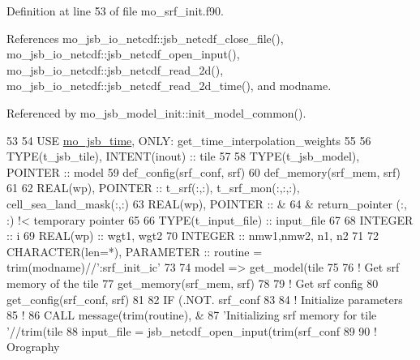 Definition at line 53 of file mo\+\_\+srf\+\_\+init.\+f90.



References mo\+\_\+jsb\+\_\+io\+\_\+netcdf\+::jsb\+\_\+netcdf\+\_\+close\+\_\+file(), mo\+\_\+jsb\+\_\+io\+\_\+netcdf\+::jsb\+\_\+netcdf\+\_\+open\+\_\+input(), mo\+\_\+jsb\+\_\+io\+\_\+netcdf\+::jsb\+\_\+netcdf\+\_\+read\+\_\+2d(), mo\+\_\+jsb\+\_\+io\+\_\+netcdf\+::jsb\+\_\+netcdf\+\_\+read\+\_\+2d\+\_\+time(), and modname.



Referenced by mo\+\_\+jsb\+\_\+model\+\_\+init\+::init\+\_\+model\+\_\+common().


\begin{DoxyCode}
53 
54     \textcolor{keywordtype}{USE }\hyperlink{namespacemo__jsb__time}{mo\_jsb\_time}\textcolor{keywordtype}{, ONLY}: get\_time\_interpolation\_weights
55 
56     \textcolor{keywordtype}{TYPE}(t\_jsb\_tile), \textcolor{keywordtype}{INTENT(inout)} :: tile
57 
58     \textcolor{keywordtype}{TYPE}(t\_jsb\_model),        \textcolor{keywordtype}{POINTER} :: model
59     def\_config(srf\_conf, srf)
60     def\_memory(srf\_mem, srf)
61 
62     \textcolor{keywordtype}{REAL(wp)}, \textcolor{keywordtype}{POINTER} :: t\_srf(:,:), t\_srf\_mon(:,:,:), cell\_sea\_land\_mask(:,:)
63     \textcolor{keywordtype}{REAL(wp)}, \textcolor{keywordtype}{POINTER} :: &
64       & return\_pointer (:,  :)       !< temporary pointer
65 
66     \textcolor{keywordtype}{TYPE}(t\_input\_file) :: input\_file
67 
68     \textcolor{keywordtype}{INTEGER}  :: i
69     \textcolor{keywordtype}{REAL(wp)} :: wgt1, wgt2
70     \textcolor{keywordtype}{INTEGER}  :: nmw1,nmw2, n1, n2
71 
72     \textcolor{keywordtype}{CHARACTER(len=*)}, \textcolor{keywordtype}{PARAMETER} :: routine = trim(modname)//\textcolor{stringliteral}{':srf\_init\_ic'}
73 
74     model => get\_model(tile%
75 
76     \textcolor{comment}{! Get srf memory of the tile}
77     get\_memory(srf\_mem, srf)
78 
79     \textcolor{comment}{! Get srf config}
80     get\_config(srf\_conf, srf)
81 
82     \textcolor{keywordflow}{IF} (.NOT. srf\_conf%
83 
84     \textcolor{comment}{! Initialize parameters}
85     \textcolor{comment}{!}
86     \textcolor{keyword}{CALL }message(trim(routine), &
87          \textcolor{stringliteral}{'Initializing srf memory for tile '}//trim(tile%
88     input\_file = jsb\_netcdf\_open\_input(trim(srf\_conf%
89 
90     \textcolor{comment}{! Orography}

\end{DoxyCode}
